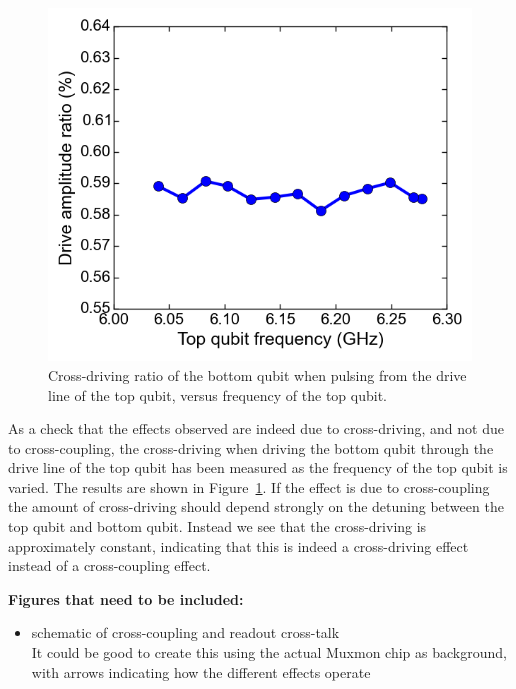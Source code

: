       \begin{figure}
        \begin{center}
        \vspace{-30pt}
          \includegraphics[width=\textwidth]{../Figures/Exploring frequency re-use/cross-driving_vs_top_frequency.png}
        \end{center}
        \vspace{-20 pt}
        \caption{Cross-driving ratio of the bottom qubit when pulsing from the drive line of the top qubit, versus frequency of the top qubit. }
        \label{fig:cross-driving versus top frequency}
      \end{figure}

      As a check that the effects observed are indeed due to cross-driving, and not due to cross-coupling, the cross-driving when driving the bottom qubit through the drive line of the top qubit has been measured as the frequency of the top qubit is varied. The results are shown in Figure~\ref{fig:cross-driving versus top frequency}. If the effect is due to cross-coupling the amount of cross-driving should depend strongly on the detuning between the top qubit and bottom qubit. Instead we see that the cross-driving is approximately constant, indicating that this is indeed a cross-driving effect instead of a cross-coupling effect.


    \textbf{Figures that need to be included:}
    \begin{itemize}
      \item schematic of cross-coupling and readout cross-talk \\
          It could be good to create this using the actual Muxmon chip as background, with arrows indicating how the different effects operate
    \end{itemize}


